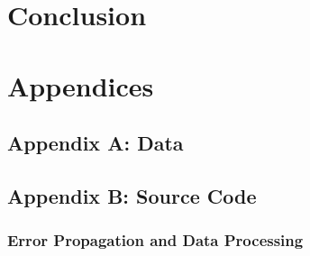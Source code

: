 \documentclass[a4paper]{article}
\begin{document}
\section{Conclusion}
\qq 

\section{Appendices}

\subsection{Appendix A: Data}

\subsection{Appendix B: Source Code}

\subsubsection{Error Propagation and Data Processing}
\end{document}
